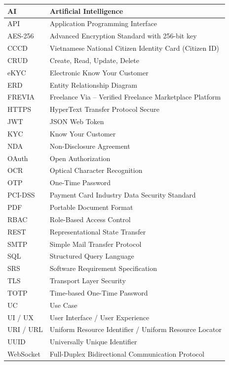 \begin{longtable}{|L{3.5cm}|L{11.5cm}|}
AI & Artificial Intelligence \\ \hline
API & Application Programming Interface \\ \hline
AES-256 & Advanced Encryption Standard with 256-bit key \\ \hline
CCCD & Vietnamese National Citizen Identity Card (Citizen ID) \\ \hline
CRUD & Create, Read, Update, Delete \\ \hline
eKYC & Electronic Know Your Customer \\ \hline
ERD & Entity Relationship Diagram \\ \hline
FREVIA & Freelance Via -- Verified Freelance Marketplace Platform \\ \hline
HTTPS & HyperText Transfer Protocol Secure \\ \hline
JWT & JSON Web Token \\ \hline
KYC & Know Your Customer \\ \hline
NDA & Non-Disclosure Agreement \\ \hline
OAuth & Open Authorization \\ \hline
OCR & Optical Character Recognition \\ \hline
OTP & One-Time Password \\ \hline
PCI-DSS & Payment Card Industry Data Security Standard \\ \hline
PDF & Portable Document Format \\ \hline
RBAC & Role-Based Access Control \\ \hline
REST & Representational State Transfer \\ \hline
SMTP & Simple Mail Transfer Protocol \\ \hline
SQL & Structured Query Language \\ \hline
SRS & Software Requirement Specification \\ \hline
TLS & Transport Layer Security \\ \hline
TOTP & Time-based One-Time Password \\ \hline
UC & Use Case \\ \hline
UI / UX & User Interface / User Experience \\ \hline
URI / URL & Uniform Resource Identifier / Uniform Resource Locator \\ \hline
UUID & Universally Unique Identifier \\ \hline
WebSocket & Full-Duplex Bidirectional Communication Protocol \\ \hline
\end{longtable}
\endgroup

\setcounter{table}{0}

\newpage
